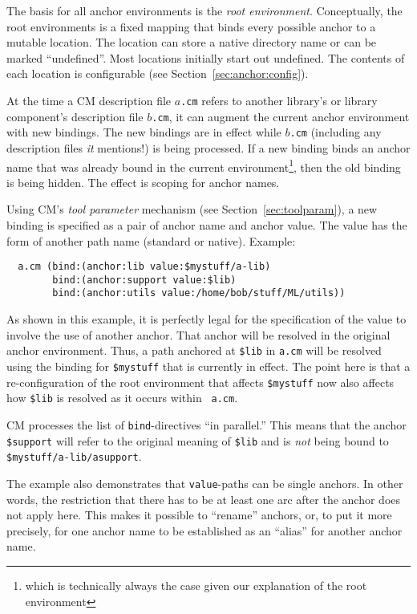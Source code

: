 The basis for all anchor environments is the {\em root environment}.
Conceptually, the root environments is a fixed mapping that binds
every possible anchor to a mutable location.  The location can store a
native directory name or can be marked ``undefined''.  Most locations
initially start out undefined.  The contents of each location is
configurable (see Section~\ref{sec:anchor:config}).

At the time a CM description file $a${\tt .cm} refers to another
library's or library component's description file $b${\tt .cm}, it can
augment the current anchor environment with new bindings.  The new
bindings are in effect while $b${\tt .cm} (including any description
files {\it it}\/ mentions!) is being processed.  If a new binding
binds an anchor name that was already bound in the current
environment\footnote{which is technically always the case given our
explanation of the root environment}, then the old binding is being
hidden.  The effect is scoping for anchor names.

Using CM's {\em tool parameter} mechanism (see
Section~\ref{sec:toolparam}), a new binding is specified as a pair of
anchor name and anchor value.  The value has the form of another path
name (standard or native). Example:

\begin{verbatim}
  a.cm (bind:(anchor:lib value:$mystuff/a-lib)
        bind:(anchor:support value:$lib)
        bind:(anchor:utils value:/home/bob/stuff/ML/utils))
\end{verbatim}

As shown in this example, it is perfectly legal for the specification
of the value to involve the use of another anchor.  That anchor will
be resolved in the original anchor environment. Thus, a path anchored
at {\tt \$lib} in {\tt a.cm} will be resolved using the binding for
{\tt \$mystuff} that is currently in effect.  The point here is that a
re-configuration of the root environment that affects {\tt \$mystuff}
now also affects how {\tt \$lib} is resolved as it occurs within {\tt
a.cm}.

CM processes the list of {\tt bind}-directives ``in parallel.'' This
means that the anchor {\tt \$support} will refer to the original
meaning of {\tt \$lib} and is {\em not} being bound to {\tt
\$mystuff/a-lib/asupport}.

The example also demonstrates that {\tt value}-paths can be single
anchors. In other words, the restriction that there has to be at least
one arc after the anchor does not apply here. This makes it possible
to ``rename'' anchors, or, to put it more precisely, for one anchor
name to be established as an ``alias'' for another anchor name.

